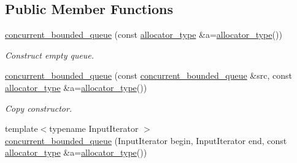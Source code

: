 \subsection*{Public Member Functions}
\begin{DoxyCompactItemize}
\item 
\hypertarget{classtbb_1_1concurrent__bounded__queue_a85f8a800cae02b601f36ad7a655a0126}{}\hyperlink{classtbb_1_1concurrent__bounded__queue_a85f8a800cae02b601f36ad7a655a0126}{concurrent\+\_\+bounded\+\_\+queue} (const \hyperlink{classtbb_1_1concurrent__bounded__queue_acbfceb845de1c770e2b56409f09b0364}{allocator\+\_\+type} \&a=\hyperlink{classtbb_1_1concurrent__bounded__queue_acbfceb845de1c770e2b56409f09b0364}{allocator\+\_\+type}())\label{classtbb_1_1concurrent__bounded__queue_a85f8a800cae02b601f36ad7a655a0126}

\begin{DoxyCompactList}\small\item\em Construct empty queue. \end{DoxyCompactList}\item 
\hypertarget{classtbb_1_1concurrent__bounded__queue_aad6fd2353d64c2c31d074cd99df58c02}{}\hyperlink{classtbb_1_1concurrent__bounded__queue_aad6fd2353d64c2c31d074cd99df58c02}{concurrent\+\_\+bounded\+\_\+queue} (const \hyperlink{classtbb_1_1concurrent__bounded__queue}{concurrent\+\_\+bounded\+\_\+queue} \&src, const \hyperlink{classtbb_1_1concurrent__bounded__queue_acbfceb845de1c770e2b56409f09b0364}{allocator\+\_\+type} \&a=\hyperlink{classtbb_1_1concurrent__bounded__queue_acbfceb845de1c770e2b56409f09b0364}{allocator\+\_\+type}())\label{classtbb_1_1concurrent__bounded__queue_aad6fd2353d64c2c31d074cd99df58c02}

\begin{DoxyCompactList}\small\item\em Copy constructor. \end{DoxyCompactList}\item 
\hypertarget{classtbb_1_1concurrent__bounded__queue_afcfdc998e106fdb7b2dfa5df880cd9cf}{}{\footnotesize template$<$typename Input\+Iterator $>$ }\\\hyperlink{classtbb_1_1concurrent__bounded__queue_afcfdc998e106fdb7b2dfa5df880cd9cf}{concurrent\+\_\+bounded\+\_\+queue} (Input\+Iterator begin, Input\+Iterator end, const \hyperlink{classtbb_1_1concurrent__bounded__queue_acbfceb845de1c770e2b56409f09b0364}{allocator\+\_\+type} \&a=\hyperlink{classtbb_1_1concurrent__bounded__queue_acbfceb845de1c770e2b56409f09b0364}{allocator\+\_\+type}())\label{classtbb_1_1concurrent__bounded__queue_afcfdc998e106fdb7b2dfa5df880cd9cf}


\end{DoxyCompactItemize}
